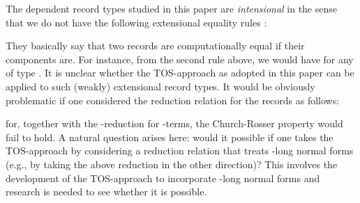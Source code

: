 \documentclass[submission,copyright,creativecommons]{eptcs}
\newcommand{\eg}{{e.g.}}
\begin{document}
The dependent record types studied in this paper are \emph{intensional} in the sense that we do not have the following extensional equality rules \cite{bet-tar:subtyping98,luo:TYPES08}:

They basically say that two records are computationally equal if their components are.  For instance, from the second rule above, we would have  for any  of type .  It is unclear whether the TOS-approach as adopted in this paper can be applied to such (weakly) extensional record types.  It would be obviously problematic if one considered the reduction relation for the records as follows:

for, together with the -reduction for -terms, the Church-Rosser property would fail to hold.  A natural question arises here: would it possible if one takes the TOS-approach by considering a reduction relation that treats -long normal forms (\eg, by taking the above reduction in the other direction)?  This involves the development of the TOS-approach to incorporate -long normal forms and research is needed to see whether it is possible.
\end{document}
